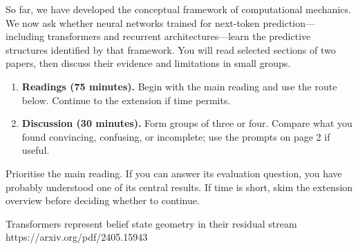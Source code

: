 \documentclass[11pt]{article}
\begin{document}
\makeiliadreadingtitle

So far, we have developed the conceptual framework of computational mechanics.
We now ask whether neural networks trained for next-token prediction---including
transformers and recurrent architectures---learn the predictive structures
identified by that framework. You will read selected sections of two papers,
then discuss their evidence and limitations in small groups.

\begin{sessionplan}
  \begin{enumerate}[nosep]
    \item \textbf{Readings (75 minutes).} Begin with the main reading and use
      the route below. Continue to the extension if time permits.
    \item \textbf{Discussion (30 minutes).} Form groups of three or four.
      Compare what you found convincing, confusing, or incomplete; use the
      prompts on page 2 if useful.
  \end{enumerate}
\end{sessionplan}

Prioritise the main reading. If you can answer its evaluation question, you
have probably understood one of its central results. If time is short, skim
the extension overview before deciding whether to continue.

\begin{reading}[Main]
  {Transformers represent belief state geometry in their residual stream}
  {https://arxiv.org/pdf/2405.15943}
  \begin{readingroute}
  \end{readingroute}

\end{reading}
\end{document}
